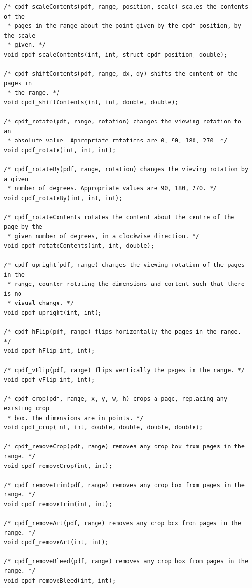 \documentclass[a4paper]{memoir}
\begin{document}
\begin{small}
\begin{lstlisting}
/* cpdf_scaleContents(pdf, range, position, scale) scales the contents of the
 * pages in the range about the point given by the cpdf_position, by the scale
 * given. */
void cpdf_scaleContents(int, int, struct cpdf_position, double);

/* cpdf_shiftContents(pdf, range, dx, dy) shifts the content of the pages in
 * the range. */
void cpdf_shiftContents(int, int, double, double);

/* cpdf_rotate(pdf, range, rotation) changes the viewing rotation to an
 * absolute value. Appropriate rotations are 0, 90, 180, 270. */
void cpdf_rotate(int, int, int);

/* cpdf_rotateBy(pdf, range, rotation) changes the viewing rotation by a given
 * number of degrees. Appropriate values are 90, 180, 270. */
void cpdf_rotateBy(int, int, int);

/* cpdf_rotateContents rotates the content about the centre of the page by the
 * given number of degrees, in a clockwise direction. */
void cpdf_rotateContents(int, int, double);

/* cpdf_upright(pdf, range) changes the viewing rotation of the pages in the
 * range, counter-rotating the dimensions and content such that there is no
 * visual change. */
void cpdf_upright(int, int);

/* cpdf_hFlip(pdf, range) flips horizontally the pages in the range. */
void cpdf_hFlip(int, int);

/* cpdf_vFlip(pdf, range) flips vertically the pages in the range. */
void cpdf_vFlip(int, int);

/* cpdf_crop(pdf, range, x, y, w, h) crops a page, replacing any existing crop
 * box. The dimensions are in points. */ 
void cpdf_crop(int, int, double, double, double, double);

/* cpdf_removeCrop(pdf, range) removes any crop box from pages in the range. */
void cpdf_removeCrop(int, int);

/* cpdf_removeTrim(pdf, range) removes any crop box from pages in the range. */
void cpdf_removeTrim(int, int);

/* cpdf_removeArt(pdf, range) removes any crop box from pages in the range. */
void cpdf_removeArt(int, int);

/* cpdf_removeBleed(pdf, range) removes any crop box from pages in the range. */
void cpdf_removeBleed(int, int);

\end{lstlisting}
\end{small}
\end{document}
